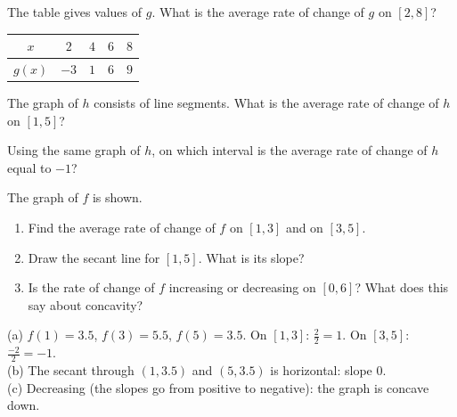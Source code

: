 \begin{exo}{}
The table gives values of $g$. What is the average rate of change of $g$ on $[2,8]$?
\begin{center}\begin{tabular}{c|cccc}$x$&$2$&$4$&$6$&$8$\\\hline$g(x)$&$-3$&$1$&$6$&$9$\end{tabular}\end{center}
\end{exo}
\begin{exo}{}
The graph of $h$ consists of line segments. What is the average rate of change of $h$ on $[1,5]$?
\end{exo}
\begin{exo}{}
Using the same graph of $h$, on which interval is the average rate of change of $h$ equal to $-1$?
\choices{$[0,3]$}{$[3,6]$}{$[1,3]$}{$[0,6]$}
\end{exo}
\begin{exo}{}
The graph of $f$ is shown.
\begin{enumerate}[label=(\alph*)]
\item Find the average rate of change of $f$ on $[1,3]$ and on $[3,5]$.
\item Draw the secant line for $[1,5]$. What is its slope?
\item Is the rate of change of $f$ increasing or decreasing on $[0,6]$? What does this say about concavity?
\end{enumerate}
\begin{solution}
(a) $f(1)=3.5$, $f(3)=5.5$, $f(5)=3.5$. On $[1,3]$: $\frac{2}{2}=1$. On $[3,5]$: $\frac{-2}{2}=-1$.\\
(b) The secant through $(1,3.5)$ and $(5,3.5)$ is horizontal: slope $0$.\\
(c) Decreasing (the slopes go from positive to negative): the graph is concave down.
\end{solution}
\end{exo}

